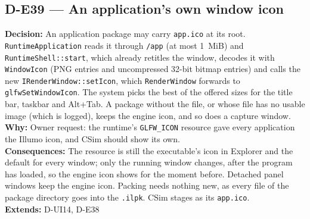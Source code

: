 \subsection*{D-E39 --- An application's own window icon}
\begin{decisionbox}[title={D-E39 \quad 2026-10-02}]
\textbf{Decision:} An application package may carry \texttt{app.ico} at its
root. \texttt{RuntimeApplication} reads it through \texttt{/app} (at most
1~MiB) and \texttt{RuntimeShell::start}, which already retitles the window,
decodes it with \texttt{WindowIcon} (PNG entries and uncompressed 32-bit
bitmap entries) and calls the new \texttt{IRenderWindow::setIcon}, which
\texttt{RenderWindow} forwards to \texttt{glfwSetWindowIcon}. The system picks
the best of the offered sizes for the title bar, taskbar and Alt+Tab. A
package without the file, or whose file has no usable image (which is logged),
keeps the engine icon, and so does a capture window.\\
\textbf{Why:} Owner request: the runtime's \texttt{GLFW\_ICON} resource gave
every application the Illumo icon, and CSim should show its own.\\
\textbf{Consequences:} The resource is still the executable's icon in Explorer
and the default for every window; only the running window changes, after the
program has loaded, so the engine icon shows for the moment before. Detached
panel windows keep the engine icon. Packing needs nothing new, as every file of
the package directory goes into the \texttt{.ilpk}. CSim stages
 as its \texttt{app.ico}.\\
\textbf{Extends:} D-UI14, D-E38
\end{decisionbox}

